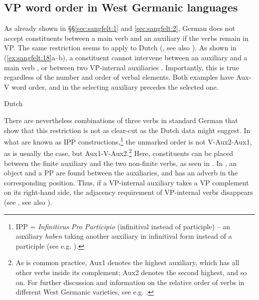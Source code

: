 \documentclass[output=paper, colorlinks, citecolor=brown]{langscibook}
\begin{document}
\subsection{VP word order in West Germanic languages}\label{sec:sangfelt:3.3}

As already shown in §§\ref{sec:sangfelt:1} and \ref{sec:sangfelt:2}, German does not accept constituents between a main verb and an auxiliary if the verbs remain in VP. The same restriction seems to apply to Dutch (\citealt[290--291]{Haider2010}, see also \citealt{Wurmbrand2004}). As shown in (\ref{ex:sangfelt:18}a–b), a constituent cannot intervene between an auxiliary and a main verb , or between two VP-internal auxiliaries . Importantly, this is true regardless of the number and order of verbal elements. Both examples have Aux-V word order, and in  the selecting auxiliary precedes the selected one.

\ea Dutch\label{ex:sangfelt:18}

\z 
\z

There are nevertheless combinations of three verbs in standard German that show that this restriction is not as clear-cut as the Dutch data might suggest. In what are known as IPP constructions,\footnote{IPP = \textit{Infinitivus Pro Participio} (infinitival instead of participle) – an auxiliary \textit{haben} taking another auxiliary in infinitival form instead of a participle (see e.g. \citealt[46–48]{Wurmbrand2004}).} the unmarked order is not V-Aux2-Aux1, as is usually the case, but Aux1-V-Aux2.\footnote{As is common practice, Aux1 denotes the highest auxiliary, which has all other verbs inside its complement; Aux2 denotes the second highest, and so on. For further discussion and information on the relative order of verbs in different West Germanic varieties, see e.g. \citet{Wurmbrand2004,Sapp2011,Culicover2014}.} Here, constituents can be placed between the finite auxiliary and the two non-finite verbs, as seen in . In , an object and a PP are found between the auxiliaries, and  has an adverb in the corresponding position. Thus, if a VP-internal auxiliary takes a VP complement on its right-hand side, the adjacency requirement of VP-internal verbs disappears (see \citealt[97–102]{Sheehan2017Final}, see also \cites[]{Haider2003}[132–135]{Haider2013}).
\end{document}
